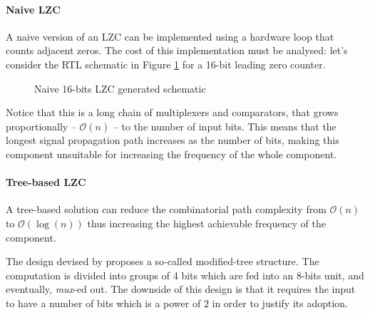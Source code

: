 \paragraph{Naive LZC}

A naive version of an LZC can be implemented using a hardware loop that counts adjacent zeros. The cost of this implementation must be analysed: let's consider the RTL schematic in Figure \ref{fig:lzc_sinthesyzed} for a 16-bit leading zero counter.



\begin{figure}[h!]
    \noindent{}
    \caption{Naive 16-bits LZC generated schematic}
    \label{fig:lzc_sinthesyzed}
\end{figure}



Notice that this is a long chain of multiplexers and comparators, that grows proportionally -- $\mathcal{O}(n)$ -- to the number of input bits. This means that the longest signal propagation path increases as the number of bits, making this component unsuitable for increasing the frequency of the whole component.

\paragraph{Tree-based LZC}

A tree-based solution can reduce the combinatorial path complexity from $\mathcal{O}(n)$ to $\mathcal{O}(\log(n))$ thus increasing the highest achievable frequency of the component.


The design devised by \cite{milenkovic_modular_2015} proposes a so-called modified-tree structure. The computation is divided into groups of 4 bits which are fed into an 8-bits unit, and eventually, \textit{mux}-ed out.
The downside of this design is that it requires the input to have a number of bits which is a power of $2$ in order to justify its adoption.

